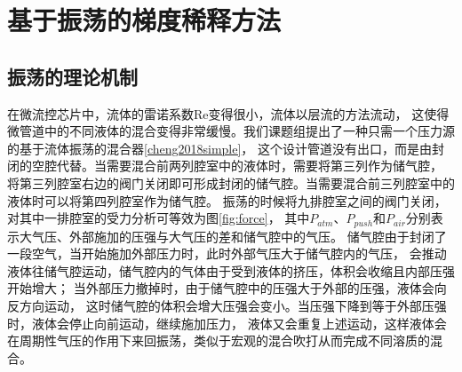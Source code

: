 \section{基于振荡的梯度稀释方法}
\subsection{振荡的理论机制}
	在微流控芯片中，流体的雷诺系数Re变得很小，流体以层流的方法流动，
	这使得微管道中的不同液体的混合变得非常缓慢。我们课题组提出了一种只需一个压力源的基于流体振荡的混合器\ref{cheng2018simple}，
	这个设计管道没有出口，而是由封闭的空腔代替。当需要混合前两列腔室中的液体时，需要将第三列作为储气腔，
	将第三列腔室右边的阀门关闭即可形成封闭的储气腔。当需要混合前三列腔室中的液体时可以将第四列腔室作为储气腔。
	振荡的时候将九排腔室之间的阀门关闭，对其中一排腔室的受力分析可等效为图\ref{fig:force}，
	其中$P_{atm}$、$P_{push}$和$P_{air}$分别表示大气压、外部施加的压强与大气压的差和储气腔中的气压。
	储气腔由于封闭了一段空气，当开始施加外部压力时，此时外部气压大于储气腔内的气压，
	会推动液体往储气腔运动，储气腔内的气体由于受到液体的挤压，体积会收缩且内部压强开始增大；
	当外部压力撤掉时，由于储气腔中的压强大于外部的压强，液体会向反方向运动，
	这时储气腔的体积会增大压强会变小。当压强下降到等于外部压强时，液体会停止向前运动，继续施加压力，
	液体又会重复上述运动，这样液体会在周期性气压的作用下来回振荡，类似于宏观的混合吹打从而完成不同溶质的混合。
